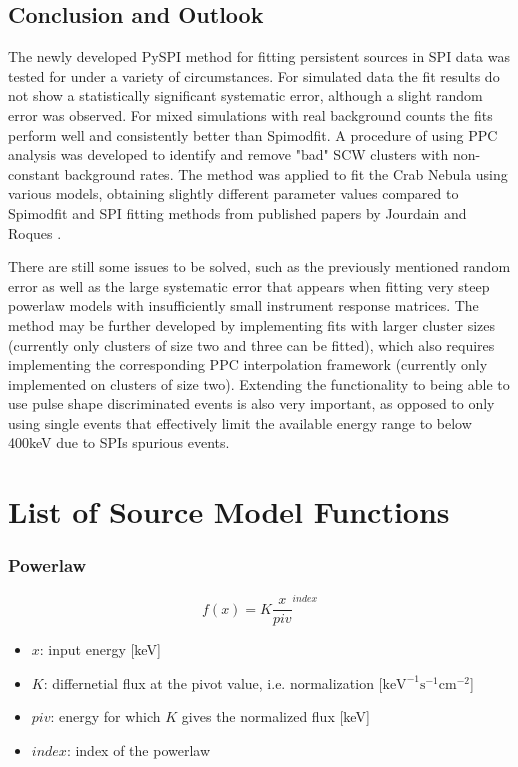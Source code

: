 \documentclass{report}
\begin{document}
\section{Conclusion and Outlook}
The newly developed PySPI method for fitting persistent sources in SPI data was tested for under a variety of circumstances. For simulated data the fit results do not show a statistically significant systematic error, although a slight random error was observed. For mixed simulations with real background counts the fits perform well and consistently better than Spimodfit. A procedure of using PPC analysis was developed to identify and remove "bad" SCW clusters with non-constant background rates. The method was applied to fit the Crab Nebula using various models, obtaining slightly different parameter values compared to Spimodfit and SPI fitting methods from published papers by Jourdain and Roques \cite{2009ApJ...704...17J}\cite{Roques}.

There are still some issues to be solved, such as the previously mentioned random error as well as the large systematic error that appears when fitting very steep powerlaw models with insufficiently small instrument response matrices. The method may be further developed by implementing fits with larger cluster sizes (currently only clusters of size two and three can be fitted), which also requires implementing the corresponding PPC interpolation framework (currently only implemented on clusters of size two). Extending the functionality to being able to use pulse shape discriminated events is also very important, as opposed to only using single events that effectively limit the available energy range to below 400keV due to SPIs spurious events. 

\appendix
\chapter{List of Source Model Functions}\label{chp source models}

\subsection*{Powerlaw}

\begin{equation} \label{powerlaw}
  f(x) = K \frac{x}{piv}^{index}
\end{equation}

\begin{itemize}
  \item $x$: input energy [keV]
  \item $K$: differnetial flux at the pivot value, i.e. normalization [$\text{keV}^{-1}\text{s}^{-1}\text{cm}^{-2}$]
  \item $piv$: energy for which $K$ gives the normalized flux [keV]
  \item $index$: index of the powerlaw
\end{itemize}
\end{document}
